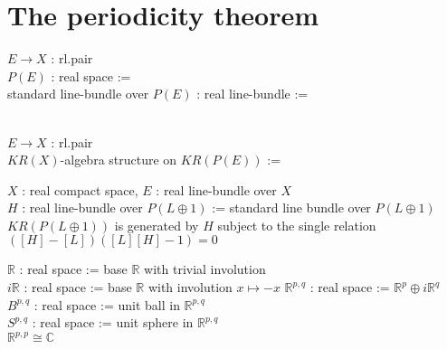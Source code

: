 \documentclass[dvipdfmx]{jsarticle}
\begin{document}
\section*{The periodicity theorem}

\begin{Definition}
\itemdefi
  \For \(E \to X\) : rl.pair \\
  \Define \(P(E)\) : real space :=  \\
  \Define standard line-bundle over \(P(E)\) : real line-bundle := 
\end{Definition}

\begin{Definition}
\itemdefi
  \OWNITEM \\
  \For \(E \to X\) : rl.pair \\
  \Define \(KR(X)\)-algebra structure on \(KR(P(E))\) := \WIP
\end{Definition}

\begin{Theorem}
\itemprop
  \For \(X\) : real compact space, \(E\) : real line-bundle over \(X\) \\
  \Let \(H\) : real line-bundle over \(P(L \oplus 1)\) := standard line bundle over \(P(L \oplus 1)\) \\
  \Then \(KR(P(L \oplus 1))\) is generated by \(H\) subject to the single relation \(([H] - [L])([L][H] - 1) = 0\)
\end{Theorem}

\begin{Proof}
\itemprof
  \ADMIT
\end{Proof}

\begin{Definition}
\itemdefi
  \Define \(\mathbb{R}\) : real space := base \(\mathbb{R}\) with trivial involution \\
  \Define \(i\mathbb{R}\) : real space := base \(\mathbb{R}\) with involution \(x \mapsto -x\)
\itemdefi
  \Define \(\mathbb{R}^{p,q}\) : real space := \(\mathbb{R}^{p} \oplus i\mathbb{R}^{q}\) \\
  \Define \(B^{p,q}\) : real space := unit ball in \(\mathbb{R}^{p,q}\) \\
  \Define \(S^{p,q}\) : real space := unit sphere in \(\mathbb{R}^{p,q}\) \\
\itemprop
  \Then \(\mathbb{R}^{p,p} \cong \mathbb{C}\)
\end{Definition}
\end{document}
